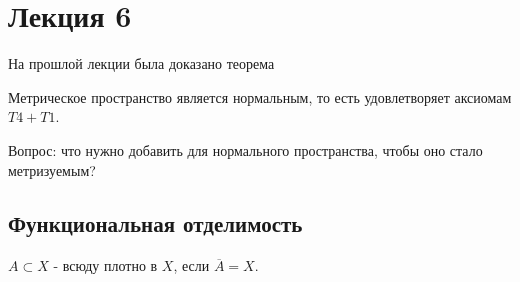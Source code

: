 \section{Лекция 6}

На прошлой лекции была доказано теорема
\begin{theorem}
    Метрическое пространство является нормальным, то есть удовлетворяет аксиомам $T4 + T1$.
\end{theorem}

Вопрос: что нужно добавить для нормального пространства, чтобы оно стало метризуемым?

\subsection{Функциональная отделимость}

    

\begin{definition}
    $A \subset X$ - всюду плотно в $X$, если $\overline{A} = X$.
\end{definition}

